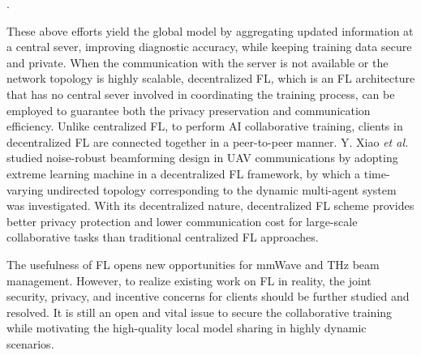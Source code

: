 \documentclass[journal,comsoc]{IEEEtran}
\begin{document}
\cite{Federated-Learning-Over-the-Air-2020,Learning-Rate-Optimization-Federated-Learning-2021,Over-the-Air-Federated-Multi-Task-Learning-2023}.


These above efforts yield the global model by aggregating updated information at a central sever, improving diagnostic accuracy, while keeping training data secure and private. When the communication with the server is not available or the network topology is highly scalable, decentralized FL, which is an FL architecture that has no central sever involved in coordinating the training process, can be employed to guarantee both the privacy preservation and communication efficiency. Unlike centralized FL, to perform AI collaborative training, clients in decentralized FL are connected together in a peer-to-peer manner. Y. Xiao \emph{et al.} \cite{Fully-Decentralized-Federated-Learning-On-Board-Mission-2021} studied noise-robust beamforming design in UAV communications by adopting extreme learning machine in a decentralized FL framework, by which a time-varying undirected topology corresponding to the dynamic multi-agent system was investigated. With its decentralized nature, decentralized FL scheme provides better privacy protection and lower communication cost for large-scale collaborative tasks than traditional centralized FL approaches.

The usefulness of FL opens new opportunities for mmWave and THz beam management. However, to realize existing work on FL in reality, the joint security, privacy, and incentive concerns for clients should be further studied and resolved. It is still an open and vital issue to secure the collaborative training while motivating the high-quality local model sharing in highly dynamic scenarios.
\end{document}
